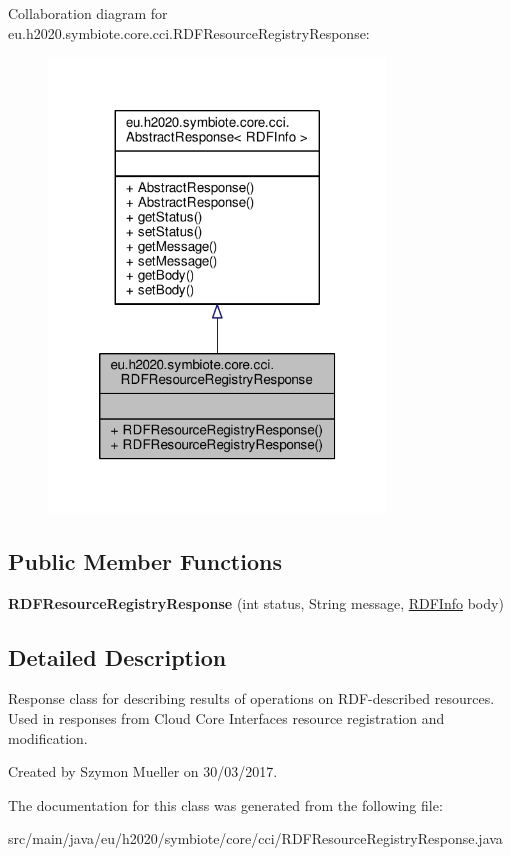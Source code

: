 Collaboration diagram for eu.\+h2020.\+symbiote.\+core.\+cci.\+R\+D\+F\+Resource\+Registry\+Response\+:
\nopagebreak
\begin{figure}[H]
\begin{center}
\leavevmode
\includegraphics[width=254pt]{classeu_1_1h2020_1_1symbiote_1_1core_1_1cci_1_1RDFResourceRegistryResponse__coll__graph}
\end{center}
\end{figure}
\subsection*{Public Member Functions}
\begin{DoxyCompactItemize}
\item 
\mbox{\label{classeu_1_1h2020_1_1symbiote_1_1core_1_1cci_1_1RDFResourceRegistryResponse_af7be59e048d60044e9f5171074bc7a4b}} 
{\bfseries R\+D\+F\+Resource\+Registry\+Response} (int status, String message, \hyperlink{classeu_1_1h2020_1_1symbiote_1_1core_1_1internal_1_1RDFInfo}{R\+D\+F\+Info} body)
\end{DoxyCompactItemize}


\subsection{Detailed Description}
Response class for describing results of operations on R\+D\+F-\/described resources. Used in responses from Cloud Core Interface\textquotesingle{}s resource registration and modification. 

Created by Szymon Mueller on 30/03/2017. 

The documentation for this class was generated from the following file\+:\begin{DoxyCompactItemize}
\item 
src/main/java/eu/h2020/symbiote/core/cci/R\+D\+F\+Resource\+Registry\+Response.\+java\end{DoxyCompactItemize}
